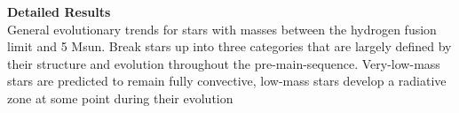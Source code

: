 \textbf{Detailed Results} \\
General evolutionary trends for stars with masses between the hydrogen fusion limit and 5 Msun. Break stars up into three categories that are largely defined by their structure and evolution throughout the pre-main-sequence. Very-low-mass stars are predicted to remain fully convective, low-mass stars develop a radiative zone at some point during their evolution
